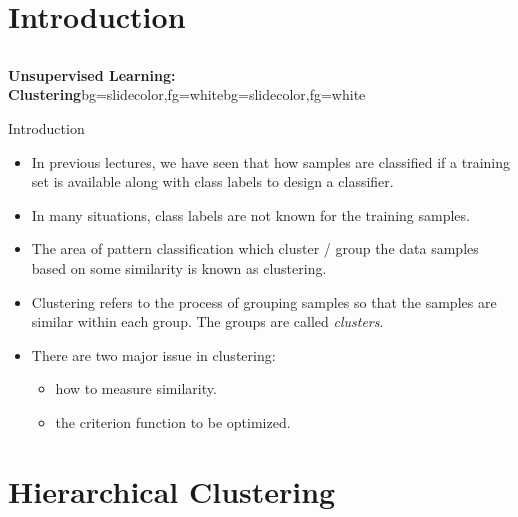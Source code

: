 \section{Introduction}
\subsection{}
\begin{frame}{}
\begin{variableblock}{\centering \Large \textbf{\vspace{4pt}\newline Unsupervised Learning: Clustering\vspace{4pt}}}{bg=slidecolor,fg=white}{bg=slidecolor,fg=white}
\end{variableblock}
\end{frame}

%

\begin{frame}{Introduction}
\begin{itemize}
\item In previous lectures, we have seen that how samples are classified if a training set is available along with class labels to design a classifier.
\item In many situations, class labels are not known for the training samples.
\item The area of pattern classification which {\color{mycolor1}cluster / group the data samples} based on some {\color{mycolor1}similarity} is known as {\color{mycolor2}clustering}.
\item Clustering refers to the process of grouping samples so that the samples are similar within each group. The groups are called \textit{\color{mycolor2}clusters}.
\item There are two major issue in clustering:
\begin{itemize}
\item how to measure {\color{mycolor2}similarity}.
\item the criterion function to be optimized.
\end{itemize}
\end{itemize}
\end{frame}


\section{Hierarchical Clustering}
